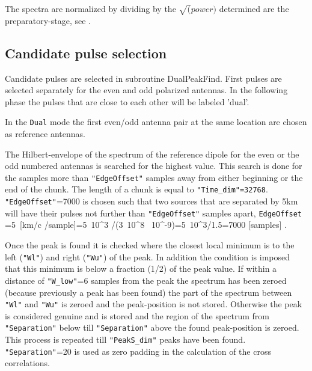 The spectra are normalized by dividing by the $\sqrt(power)$ determined are the preparatory-stage, see .

\subsection{Candidate pulse selection}


Candidate pulses are selected in subroutine DualPeakFind. First pulses are selected separately for the even and odd polarized antennas. In the following phase the pulses that are close to each other will be labeled 'dual'.

In the \verb!Dual! mode the first even/odd antenna pair at the same location are chosen as reference antennas.


The Hilbert-envelope of the spectrum of the reference dipole for the even or the odd numbered antennas is searched for the highest value. This search is done for the samples more than \verb!"EdgeOffset"! samples away from either beginning or the end of the chunk. The length of a chunk is equal to \verb!"Time_dim"=32768!.  \verb!"EdgeOffset"!=7000 
is chosen such that two sources that are separated by 5km  will have their pulses not further than \verb!"EdgeOffset"! samples apart,
\beq
{\texttt{EdgeOffset}} =5\ \rm{[km/c /sample]}=5\, 10^3 /(3\, 10^8 \, 10^{-9})=5\, 10^3/1.5=7000\; \rm{[samples]} \;.
\eeq

Once the peak is found it is checked where the closest local minimum is to the left  (\verb!"Wl"!) and right (\verb!"Wu"!) of the peak. In addition the condition is imposed that this minimum is below a fraction (1/2) of the peak value. If within a distance of \verb!"W_low"!=6 samples from the peak the spectrum has been zeroed (because previously a peak has been found) the part of the spectrum between \verb!"Wl"! and \verb!"Wu"! is zeroed and the peak-position is not stored. Otherwise the peak is considered genuine and is stored and the region of the spectrum from \verb!"Separation"! below till \verb!"Separation"! above the found peak-position is zeroed. This process is repeated till \verb!"PeakS_dim"! peaks have been found. \verb!"Separation"!=20 is used as zero padding in the calculation of the cross correlations.


